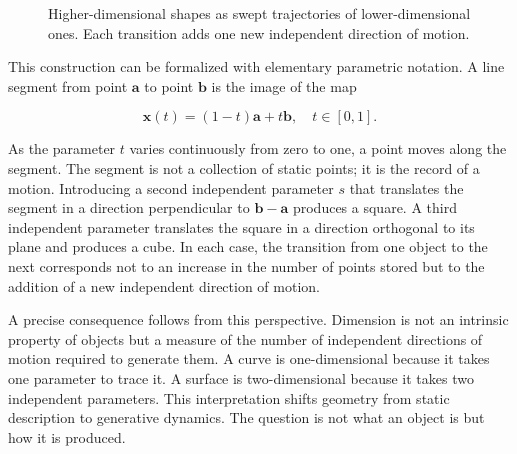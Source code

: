 \documentclass[11pt, a4paper]{article}
\theoremstyle{plain}
\theoremstyle{definition}
\theoremstyle{remark}
\begin{document}
\begin{figure}[h]
\centering
{}
\caption{Higher-dimensional shapes as swept trajectories of lower-dimensional ones.
Each transition adds one new independent direction of motion.}
\end{figure}

This construction can be formalized with elementary parametric notation.
A line segment from point $\mathbf{a}$ to point $\mathbf{b}$ is the image of the map

\begin{equation}
\mathbf{x}(t) = (1-t)\mathbf{a} + t\mathbf{b}, \quad t \in [0,1].
\label{eq:line}
\end{equation}

As the parameter $t$ varies continuously from zero to one, a point moves along the
segment. The segment is not a collection of static points; it is the record of a motion.
Introducing a second independent parameter $s$ that translates the segment in a
direction perpendicular to $\mathbf{b} - \mathbf{a}$ produces a square. A third
independent parameter translates the square in a direction orthogonal to its plane and
produces a cube. In each case, the transition from one object to the next corresponds
not to an increase in the number of points stored but to the addition of a new
independent direction of motion.

A precise consequence follows from this perspective. Dimension is not an intrinsic
property of objects but a measure of the number of independent directions of motion
required to generate them. A curve is one-dimensional because it takes one parameter
to trace it. A surface is two-dimensional because it takes two independent parameters.
This interpretation shifts geometry from static description to generative dynamics.
The question is not what an object is but how it is produced.
\end{document}

